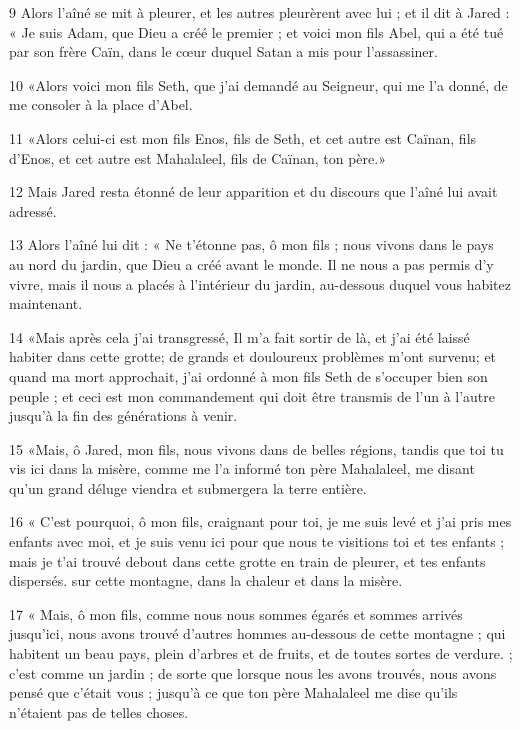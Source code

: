\par 9 Alors l'aîné se mit à pleurer, et les autres pleurèrent avec lui ; et il dit à Jared : « Je suis Adam, que Dieu a créé le premier ; et voici mon fils Abel, qui a été tué par son frère Caïn, dans le cœur duquel Satan a mis pour l'assassiner.

\par 10 «Alors voici mon fils Seth, que j'ai demandé au Seigneur, qui me l'a donné, de me consoler à la place d'Abel.

\par 11 «Alors celui-ci est mon fils Enos, fils de Seth, et cet autre est Caïnan, fils d'Enos, et cet autre est Mahalaleel, fils de Caïnan, ton père.»

\par 12 Mais Jared resta étonné de leur apparition et du discours que l'aîné lui avait adressé.

\par 13 Alors l'aîné lui dit : « Ne t'étonne pas, ô mon fils ; nous vivons dans le pays au nord du jardin, que Dieu a créé avant le monde. Il ne nous a pas permis d'y vivre, mais il nous a placés à l'intérieur du jardin, au-dessous duquel vous habitez maintenant.

\par 14 «Mais après cela j'ai transgressé, Il m'a fait sortir de là, et j'ai été laissé habiter dans cette grotte; de ​​grands et douloureux problèmes m'ont survenu; et quand ma mort approchait, j'ai ordonné à mon fils Seth de s'occuper bien son peuple ; et ceci est mon commandement qui doit être transmis de l'un à l'autre jusqu'à la fin des générations à venir.

\par 15 «Mais, ô Jared, mon fils, nous vivons dans de belles régions, tandis que toi tu vis ici dans la misère, comme me l'a informé ton père Mahalaleel, me disant qu'un grand déluge viendra et submergera la terre entière.

\par 16 « C'est pourquoi, ô mon fils, craignant pour toi, je me suis levé et j'ai pris mes enfants avec moi, et je suis venu ici pour que nous te visitions toi et tes enfants ; mais je t'ai trouvé debout dans cette grotte en train de pleurer, et tes enfants dispersés. sur cette montagne, dans la chaleur et dans la misère.

\par 17 « Mais, ô mon fils, comme nous nous sommes égarés et sommes arrivés jusqu'ici, nous avons trouvé d'autres hommes au-dessous de cette montagne ; qui habitent un beau pays, plein d'arbres et de fruits, et de toutes sortes de verdure. ; c'est comme un jardin ; de sorte que lorsque nous les avons trouvés, nous avons pensé que c'était vous ; jusqu'à ce que ton père Mahalaleel me dise qu'ils n'étaient pas de telles choses.

